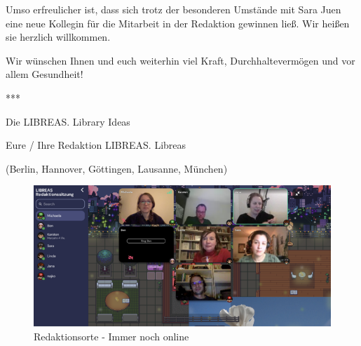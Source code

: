 \documentclass[a4paper,
fontsize=11pt,
oneside,
numbers=noperiodatend,
parskip=half-,
bibliography=totoc,
final
]{scrartcl}
\begin{document}
Umso erfreulicher ist, dass sich trotz der besonderen Umstände mit Sara
Juen eine neue Kollegin für die Mitarbeit in der Redaktion gewinnen
ließ. Wir heißen sie herzlich willkommen.

Wir wünschen Ihnen und euch weiterhin viel Kraft, Durchhaltevermögen und
vor allem Gesundheit!

***

Die LIBREAS. Library Ideas

Eure / Ihre Redaktion LIBREAS. Libreas

(Berlin, Hannover, Göttingen, Lausanne, München)

\begin{figure}[t]
\centering
\includegraphics[width=.9\textwidth]{img/img2}
\caption{Redaktionsorte - Immer noch online}
\end{figure}
\end{document}
